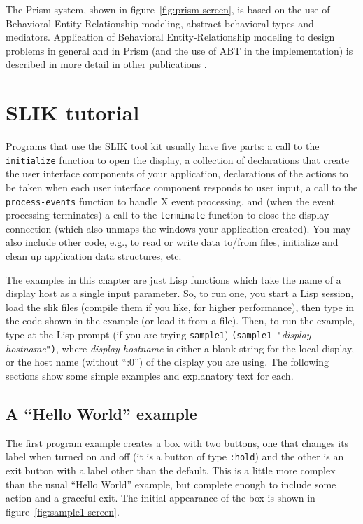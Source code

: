 \documentclass[twoside,openright,11pt]{report}
\newcommand{\tp}[1]{\texttt{#1}}
\begin{document}
The Prism system, shown in figure~\ref{fig:prism-screen}, is based on
the use of Behavioral Entity-Relationship modeling, abstract
behavioral types and mediators.  Application of Behavioral
Entity-Relationship modeling to design problems in general and in
Prism (and the use of ABT in the implementation) is described in more
detail in other publications \cite{sullivan94,sullivan96}.

\chapter{SLIK tutorial} \label{sec:tutorial}

Programs that use the SLIK tool kit usually have five parts: a call to
the \tp{initialize} function to open the display, a collection of
declarations that create the user interface components of your
application, declarations of the actions to be taken when each user
interface component responds to user input, a call to the
\tp{process-events} function to handle X event processing, and (when
the event processing terminates) a call to the \tp{terminate} function
to close the display connection (which also unmaps the windows your
application created).  You may also include other code, e.g., to read
or write data to/from files, initialize and clean up application data
structures, etc.

The examples in this chapter are just Lisp functions which take the
name of a display host as a single input parameter.  So, to run one,
you start a Lisp session, load the slik files (compile them if you
like, for higher performance), then type in the code shown in the
example (or load it from a file).  Then, to run the example, type at
the Lisp prompt (if you are trying \tp{sample1})
\tp{(sample1~"}\textit{display-hostname}\tp{")}, where
\textit{display-hostname} is either a blank string for the local
display, or the host name (without ``:0'') of the display you are
using.  The following sections show some simple examples and
explanatory text for each.

\section{A ``Hello World'' example}

The first program example creates a box with two buttons, one that
changes its label when turned on and off (it is a button of type
\tp{:hold}) and the other is an exit button with a label other than
the default.  This is a little more complex than the usual ``Hello
World'' example, but complete enough to include some action and a
graceful exit.  The initial appearance of the box is shown in
figure~\ref{fig:sample1-screen}.
\end{document}
